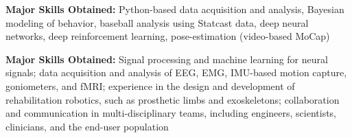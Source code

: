 
{\small{\color{skills}\textbf{Major Skills Obtained:}} Python-based data acquisition and analysis, Bayesian modeling of behavior, baseball analysis using Statcast data, deep neural networks, deep reinforcement learning, pose-estimation (video-based MoCap)} \\

\vspace{-0.5em}
\divider

{\small{\color{skills}\textbf{Major Skills Obtained:}} Signal processing and machine learning for neural signals; data acquisition and analysis of EEG, EMG, IMU-based motion capture, goniometers, and fMRI; experience in the design and development of rehabilitation robotics, such as prosthetic limbs and exoskeletons; collaboration and communication in multi-disciplinary teams, including engineers, scientists, clinicians, and the end-user population} \\
